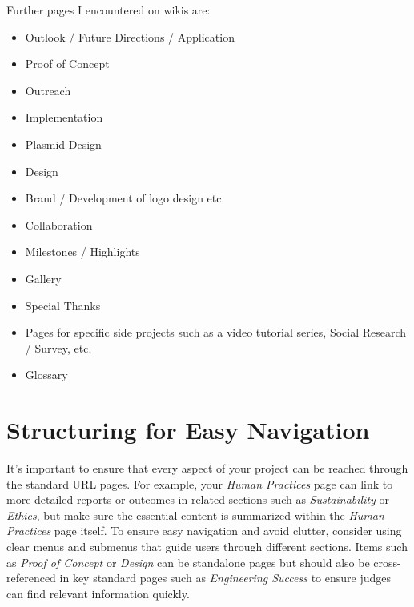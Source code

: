 Further pages I encountered on wikis are:
\begin{itemize}
    \item Outlook / Future Directions / Application
    \item Proof of Concept
    \item Outreach
    \item Implementation
    \item Plasmid Design
    \item Design
    \item Brand / Development of logo design etc.
    \item Collaboration
    \item Milestones / Highlights
    \item Gallery
    \item Special Thanks
    \item Pages for specific side projects such as a video tutorial series,  Social Research / Survey, etc.
    \item Glossary
\end{itemize}


\section{Structuring for Easy Navigation}\label{sec:structuring-for-easy-navigation}

It’s important to ensure that every aspect of your project can be reached through the standard URL pages.
For example, your \textit{Human Practices} page can link to more detailed reports or outcomes in related sections such as \textit{Sustainability} or \textit{Ethics}, but make sure the essential content is summarized within the \textit{Human Practices} page itself. \newline
To ensure easy navigation and avoid clutter, consider using clear menus and submenus that guide users through different sections.
Items such as \textit{Proof of Concept} or \textit{Design} can be standalone pages but should also be cross-referenced in key standard pages such as \textit{Engineering Success} to ensure judges can find relevant information quickly.


